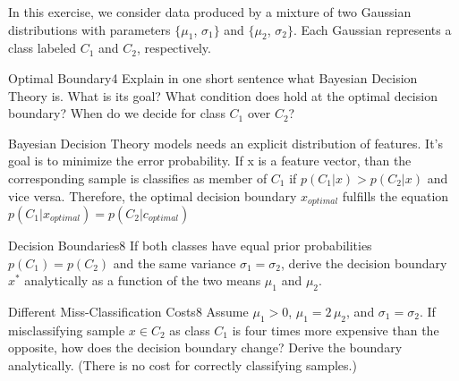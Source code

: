 \newif\ifvimbug
\vimbugfalse

\ifvimbug

\fi

In this exercise, we consider data produced by a mixture of two Gaussian distributions with parameters $\{\mu_1$, $\sigma_1\}$ and $\{\mu_2$, $\sigma_2\}$. Each Gaussian represents a class labeled $C_1$ and $C_2$, respectively. 

\begin{questions}


\begin{question}{Optimal Boundary}{4}
Explain in one short sentence what Bayesian Decision Theory is. What is its goal? 
What condition does hold at the optimal decision boundary? When do we decide for class $C_1$ over $C_2$?

\begin{answer}
	Bayesian Decision Theory models needs an explicit distribution of features. It's goal is to minimize the error probability. If x is a feature vector, than the corresponding sample is classifies as member of $C_1$ if $p(C_1 | x) > p(C_2|x)$ and vice versa. Therefore, the optimal decision boundary $x_{optimal}$ fulfills the equation $p(C_1 | x_{optimal}) = p(C_2 | c_{optimal})$

\end{answer}

\end{question}



\begin{question}{Decision Boundaries}{8}
If both classes have equal prior probabilities $p(C_1) = p(C_2)$ and the same variance $\sigma_1 = \sigma_2$, derive the decision boundary $x^*$ analytically as a function of the two means $\mu_1$ and $\mu_2$.

\begin{answer}

\end{answer}

\end{question}


\begin{question}{Different Miss-Classification Costs}{8}
Assume $\mu_1 > 0$, $\mu_1 = 2\, \mu_2$, and $\sigma_1=\sigma_2$. If misclassifying sample $x \in C_2$ as class $C_1$ is four times more expensive than the opposite, how does the decision boundary change? Derive the boundary analytically.
(There is no cost for correctly classifying samples.)

\begin{answer}

\end{answer}

\end{question}


\end{questions}

